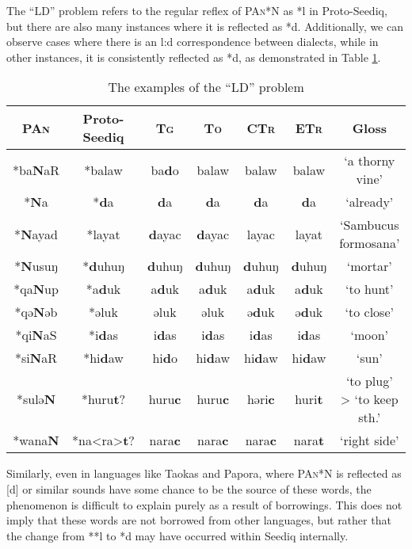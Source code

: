 \documentclass[12pt]{article}
\newcommand{\pan}{\textsc{PAn}\xspace}
\newcommand{\psedf}{Proto-Seediq\xspace}
\newcommand{\stg}{\textsc{Tg}\xspace}
\newcommand{\sto}{\textsc{To}\xspace}
\newcommand{\sctr}{\textsc{CTr}\xspace}
\newcommand{\setr}{\textsc{ETr}\xspace}
\begin{document}
The ``LD'' problem refers to the regular reflex of \pan *N as *l in \psedf, but there are also many instances where it is reflected as *d. Additionally, we can observe cases where there is an l:d correspondence between dialects, while in other instances, it is consistently reflected as *d, as demonstrated in Table \ref{tab:ld}.

\begin{table}[!htbp]
\centering
\caption{The examples of the ``LD'' problem}
\label{tab:ld}
\begin{tabular}{ccccccc}
\hline
\pan   & \psedf    & \stg  & \sto & \sctr & \setr & Gloss                     \\ \hline
*ba\textbf{N}aR & *balaw & ba\textbf{d}o   & balaw & balaw  & balaw  & `a thorny vine'           \\
*\textbf{N}a    & *\textbf{d}a       & \textbf{d}a    & \textbf{d}a    & \textbf{d}a     & \textbf{d}a     & `already'                 \\
*\textbf{N}ayad & *layat & \textbf{d}ayac  & \textbf{d}ayac & layac  & layat  & `Sambucus formosana'      \\
*\textbf{N}usuŋ & *\textbf{d}uhuŋ    & \textbf{d}uhuŋ  & \textbf{d}uhuŋ & \textbf{d}uhuŋ  & \textbf{d}uhuŋ  & `mortar'                  \\
*qa\textbf{N}up & *a\textbf{d}uk     & a\textbf{d}uk   & a\textbf{d}uk  & a\textbf{d}uk   & a\textbf{d}uk   & `to hunt'                 \\
*qə\textbf{N}əb & *əluk  & əluk   & əluk  & ə\textbf{d}uk   & ə\textbf{d}uk   & `to close'                \\
*qi\textbf{N}aS & *i\textbf{d}as     & i\textbf{d}as   & i\textbf{d}as  & i\textbf{d}as   & i\textbf{d}as   & `moon'                    \\
*si\textbf{N}aR & *hi\textbf{d}aw    & hi\textbf{d}o   & hi\textbf{d}aw & hi\textbf{d}aw  & hi\textbf{d}aw  & `sun'                     \\
*sulə\textbf{N} & *huru\textbf{t}?   & huru\textbf{c}  & huru\textbf{c} & həri\textbf{c}  & huri\textbf{t}  & `to plug' > `to keep sth.' \\
*wana\textbf{N} & *na<ra>\textbf{t}? & nara\textbf{c}  & nara\textbf{c} & nara\textbf{c}  & nara\textbf{t}  & `right side'              \\ \hline
\end{tabular}
\end{table}

Similarly, even in languages like Taokas and Papora, where \pan *N is reflected as [d] or similar sounds have some chance to be the source of these words, the phenomenon is difficult to explain purely as a result of borrowings. This does not imply that these words are not borrowed from other languages, but rather that the change from **l to *d may have occurred within Seediq internally.
\end{document}
